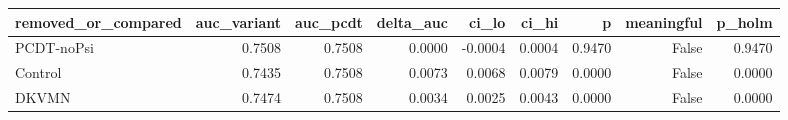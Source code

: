 \begin{tabular}{lrrrrrrrr}
\toprule
removed\_or\_compared & auc\_variant & auc\_pcdt & delta\_auc & ci\_lo & ci\_hi & p & meaningful & p\_holm \\
\midrule
PCDT-noPsi & 0.7508 & 0.7508 & 0.0000 & -0.0004 & 0.0004 & 0.9470 & False & 0.9470 \\
Control & 0.7435 & 0.7508 & 0.0073 & 0.0068 & 0.0079 & 0.0000 & False & 0.0000 \\
DKVMN & 0.7474 & 0.7508 & 0.0034 & 0.0025 & 0.0043 & 0.0000 & False & 0.0000 \\
\bottomrule
\end{tabular}
